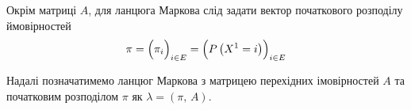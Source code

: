 Окрім матриці $A$, для ланцюга Маркова слід задати вектор початкового розподілу ймовірностей
\begin{equation*}
    \pi = \Bigl( \pi_i \Bigr)_{i \in E} = \Bigl( P\left( X^{1} = i \right) \Bigr)_{i \in E}
\end{equation*}





Надалі позначатимемо ланцюг Маркова з матрицею перехідних імовірностей $A$ та початковим розподілом $\pi$ як $\lambda=(\pi,\,A)$.


